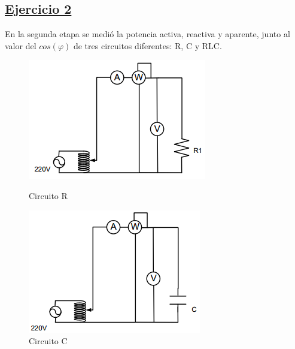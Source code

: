 \documentclass[a4paper]{article}
\begin{document}
\subsection*{\underline{Ejercicio 2}}

En la segunda etapa se medió la potencia activa, reactiva y aparente, junto al valor del $cos(\varphi)$ de tres circuitos diferentes: R, C y RLC.

\begin{figure}[H]
\centering
\begin{minipage}{.5\textwidth}
  \centering
  \includegraphics[width=.8\linewidth]{Circuito-ejercicio-2A}
  \caption{Circuito R}
\end{minipage}%
\begin{minipage}{.5\textwidth}
  \centering
  \includegraphics[width=.8\linewidth]{Circuito-ejercicio-2B}
  \caption{Circuito C}

\end{minipage}%
\end{figure}
\end{document}
